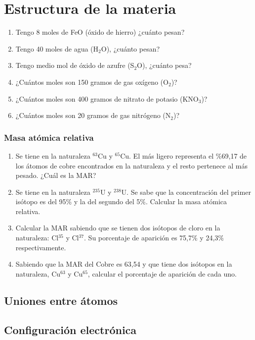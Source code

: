 \section{Estructura de la materia}

\begin{enumerate}
\item Tengo 8 moles de FeO (óxido de hierro) ¿cuánto pesan? 
\item Tengo 40 moles de agua (H$_2$O), ¿cuánto pesan? 
\item Tengo medio mol de óxido de azufre (S$_2$O), ¿cuánto pesa? 
\item ¿Cuántos moles son 150 gramos de gas oxígeno (O$_2$)? 
\item ¿Cuántos moles son 400 gramos de nitrato de potasio (KNO$_3$)?
\item ¿Cuántos moles son 20 gramos de gas nitrógeno (N$_2$)?
\end{enumerate}

\subsubsection*{Masa atómica relativa}

\begin{enumerate}
\item Se tiene en la naturaleza $^{63}$Cu y $^{65}$Cu. El más ligero representa el \%69,17 de los átomos de cobre encontrados en la naturaleza y el resto pertenece al más pesado. ¿Cuál es la MAR?

\item Se tiene en la naturaleza $^{235}$U y $^{238}$U. Se sabe que la concentración del primer isótopo es del 95\% y la del segundo del 5\%. Calcular la masa atómica relativa.

\item Calcular la MAR sabiendo que se tienen dos isótopos de cloro en la naturaleza: Cl$^{35}$ y Cl$^{37}$. Su porcentaje de aparición es 75,7\% y 24,3\% respectivamente.

\item Sabiendo que la MAR del Cobre es 63,54 y que tiene dos isótopos en la naturaleza, Cu$^{63}$ y Cu$^{65}$, calcular el porcentaje de aparición de cada uno.
\end{enumerate}


\subsection*{Uniones entre átomos}


\subsection*{Configuración electrónica}
